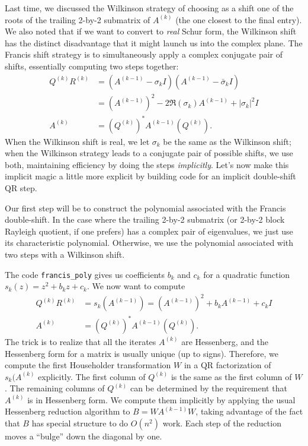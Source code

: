 \documentclass[12pt, leqno]{article} %
\begin{document}
Last time, we discussed the Wilkinson strategy of choosing as a shift
one of the roots of the trailing 2-by-2 submatrix of $A^{(k)}$ (the
one closest to the final entry).  We also noted that if we want to
convert to {\em real} Schur form, the Wilkinson shift has the distinct
disadvantage that it might launch us into the complex plane.  The
Francis shift strategy is to simultaneously apply a complex conjugate
pair of shifts, essentially computing two steps together:
\begin{align*}
  Q^{(k)} R^{(k)} &= (A^{(k-1)}-\sigma_k I)(A^{(k-1)}-\bar{\sigma}_k I) \\
                &= (A^{(k-1)})^2 - 2\Re(\sigma_k) A^{(k-1)} + |\sigma_k|^2 I \\
  A^{(k)}        &= (Q^{(k)})^* A^{(k-1)} (Q^{(k)}).
\end{align*}
When the Wilkinson shift is real, we let $\sigma_k$ be the same as the
Wilkinson shift; when the Wilkinson strategy leads to a conjugate pair
of possible shifts, we use both, maintaining efficiency by doing the
steps {\em implicitly}.  Let's now make this implicit magic a little
more explicit by building code for an implicit double-shift QR step.

Our first step will be to construct the polynomial associated with the
Francis double-shift.  In the case where the trailing 2-by-2 submatrix
(or 2-by-2 block Rayleigh quotient, if one prefers) has a complex pair
of eigenvalues, we just use its characteristic polynomial.  Otherwise,
we use the polynomial associated with two steps with a Wilkinson shift.



The code {\tt francis\_poly} gives us coefficients $b_k$ and $c_k$ for a
quadratic function $s_k(z) = z^2 + b_k z + c_k$.  We now want to compute
\begin{align*}
  Q^{(k)} R^{(k)} &= s_k(A^{(k-1)}) = (A^{(k-1)})^2 + b_k A^{(k-1)} + c_k I \\
  A^{(k)}        &= (Q^{(k)})^* A^{(k-1)} (Q^{(k)}).
\end{align*}
The trick is to realize that all the iterates $A^{(k)}$ are Hessenberg,
and the Hessenberg form for a matrix is usually unique (up to signs).
Therefore, we compute the first Householder transformation $W$ in a
QR factorization of $s_k(A^{(k)}$ explicitly.  The first column of $Q^{(k)}$
is the same as the first column of $W$.  The remaining columns of $Q^{(k)}$
can be determined by the requirement that $A^{(k)}$ is in Hessenberg form.
We compute them implicitly by applying the usual Hessenberg reduction algorithm
to $B = WA^{(k-1)}W$, taking advantage of the fact that $B$ has special
structure to do $O(n^2)$ work.  Each step of the reduction moves a ``bulge''
down the diagonal by one.
\end{document}
